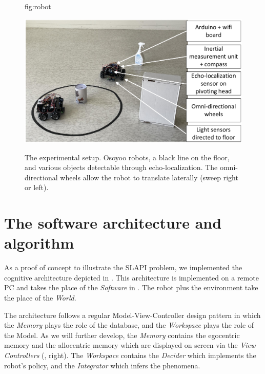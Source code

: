 \documentclass[pmlr]{jmlr}%
\begin{document}
\begin{figure}[htbp]
	\floatconts
	{fig:robot}
	{\caption{The experimental setup. 
			Osoyoo robots, a black line on the floor, and various objects detectable through echo-localization.
		    The omni-directional wheels allow the robot to translate laterally (sweep right or left).}}
	{\includegraphics[width=0.7\linewidth]{images/Figure_1_Robotb}}
\end{figure}


\section{The software architecture and algorithm}
\label{sec:software}

As a proof of concept to illustrate the SLAPI problem, we implemented the cognitive architecture depicted in . 
This architecture is implemented on a remote PC and takes the place of the \textit{Software} in . 
The robot plus the environment take the place of the \textit{World}.

The architecture follows a regular Model-View-Controller design pattern in which the \textit{Memory} plays the role of the database, and the \textit{Workspace} plays the role of the Model. 
As we will further develop, the \textit{Memory} contains the egocentric memory and the allocentric memory which are displayed on screen via the \textit{View Controllers} (, right).
The \textit{Workspace} contains the \textit{Decider} which implements the robot's policy, and the \textit{Integrator} which infers the phenomena. 
\end{document}
